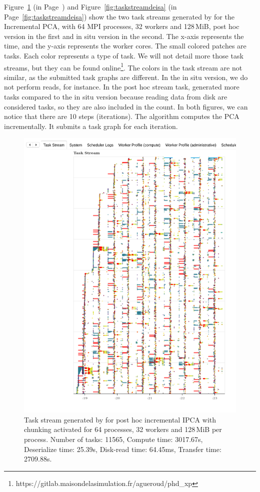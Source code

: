 Figure~\ref{fig:taskstreamdask} (in Page~\pageref{fig:taskstreamdask}) and Figure~\ref{fig:taskstreamdeisa} (in Page~\ref{fig:taskstreamdeisa}) show the two task streams generated by \dask for the Incremental PCA, with 64 MPI processes, 32 workers and 128\,MiB, \dask post hoc version in the first and \deisa in situ version in the second. The x-axis represents the time, and the y-axis represents the worker cores. 
The small colored patches are tasks. Each color represents a type of task. We will not detail more those task streams, but they can be found online\footnote{https://gitlab.maisondelasimulation.fr/agueroud/phd\_xp}. 
The colors in the task stream are not similar, as the submitted task graphs are different. In the in situ version, we do not perform reads, for instance.
In the post hoc stream task, \dask generated more tasks compared to the in situ version because reading data from disk are considered tasks, so they are also included in the count. 
In both figures, we can notice that there are 10 steps (iterations). The algorithm computes the PCA incrementally. It submits a task graph for each iteration.


\begin{figure}[h!]\centering
\includegraphics[width=\columnwidth]{figures/P64_W32_D128_DASK_CHUNK.pdf}
\caption{Task stream generated by \dask for post hoc incremental IPCA with chunking activated for 64 processes, 32 workers and 128\,MiB per process. 
    Number of tasks: 11565,
    Compute time: 3017.67s, 
    Deserialize time: 25.39s,
    Disk-read time: 64.45ms,
    Transfer time: 2709.88s.}
\label{fig:taskstreamdask}
\end{figure}


